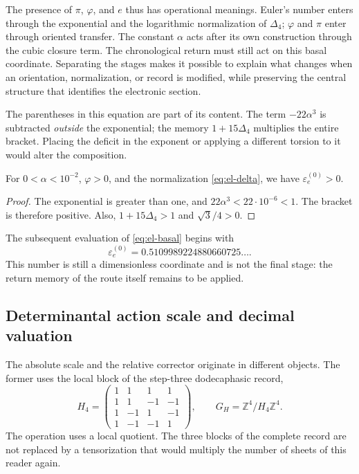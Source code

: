 The presence of \(\pi\), \(\varphi\), and \(e\) thus has operational
meanings. Euler's number enters through the exponential and
the logarithmic normalization of \(\Delta_4\); \(\varphi\) and \(\pi\)
enter through oriented transfer. The constant \(\alpha\)
acts after its own construction through the cubic closure
term. The chronological return must still act on this basal
coordinate. Separating the stages makes it possible to explain what changes when
an orientation, normalization, or record is modified, while preserving the central
structure that identifies the electronic section.

The parentheses in this equation are part of its content. The term
\(-22\alpha^3\) is subtracted \emph{outside} the exponential; the memory
\(1+15\Delta_4\) multiplies the entire bracket. Placing the deficit in
the exponent or applying a different torsion to it would alter the composition.

\begin{proposition}
For \(0<\alpha<10^{-2}\), \(\varphi>0\), and the normalization
\eqref{eq:el-delta}, we have \(\varepsilon_e^{(0)}>0\).
\end{proposition}
\begin{proof}
The exponential is greater than one, and
\(22\alpha^3<22\cdot10^{-6}<1\). The bracket is therefore positive.
Also, \(1+15\Delta_4>1\) and \(\sqrt3/4>0\).
\end{proof}

The subsequent evaluation of \eqref{eq:el-basal} begins with
\[
 \varepsilon_e^{(0)}=0.5109989224880660725\ldots.
\]
This number is still a dimensionless coordinate and is not the
final stage: the return memory of the route itself remains to be applied.

\subsection{Determinantal action scale and decimal valuation}

The absolute scale and the relative corrector originate in different
objects. The former uses the local block of the step-three dodecaphasic
record,
\begin{equation}
 H_4=\begin{pmatrix}
 1&1&1&1\\1&1&-1&-1\\1&-1&1&-1\\1&-1&-1&1
 \end{pmatrix},\qquad
 G_H=\mathbb Z^4/H_4\mathbb Z^4.
 \label{eq:el-h4}
\end{equation}
The operation uses a local quotient. The three blocks of the complete
record are not replaced by a tensorization that would multiply
the number of sheets of this reader again.

